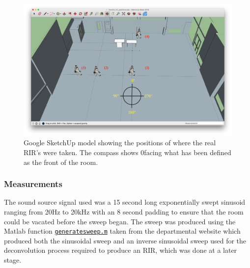 \documentclass[../../main.tex]{subfiles}
\begin{document}
		\begin{figure}
			\begin{center}
				\includegraphics[width=\textwidth]{Sections/Implementation/RealRIRs/images/Real_RIRs7_editV2.png} 
				\caption{Google SketchUp model showing the positions of where the real \ac{RIR}'s were taken. The compass shows 0\textdegree facing what has been defined as the front of the room.}
				\label{rirPositions}
			\end{center}
		\end{figure}

	\subsubsection{Measurements}
		The sound source signal used was a 15 second long exponentially swept sinusoid ranging from 20Hz to 20kHz with an 8 second padding to ensure that the room could be vacated before the sweep began. The sweep was produced using the Matlab function \href{http://lt669.github.io/code/matlab/html/generatesweep.html}{\texttt{generatesweep.m}} taken from the departmental website \cite{sineSweep} which produced both the sinusoidal sweep and an inverse sinusoidal sweep used for the deconvolution process required to produce an \ac{RIR}, which was done at a later stage.
		
\end{document}
